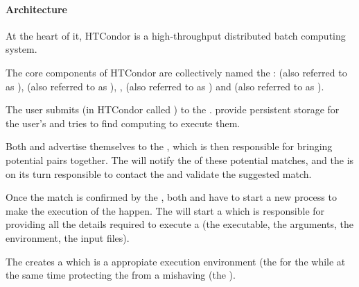 \documentclass{sig-alternate}
\begin{document}



\paragraph{Architecture}

At the heart of it, HTCondor is a high-throughput distributed batch computing
system.

%
%
The core components of HTCondor are collectively named the :  (also referred to as ),
 (also referred to as ), ,
 (also referred to as ) and
 (also referred to as ).

The user submits  (in HTCondor called ) to the
.
 provide persistent storage for the user's  and
tries to find computing   to execute them.

Both  and  advertise themselves to the
, which is then responsible for bringing potential pairs
together. The  will notify the  of these
potential matches, and the  is on its turn responsible to
contact the  and validate the suggested match.

Once the match is confirmed by the , both 
and  have to start a new process to make the execution of the
 happen.
The  will start a  which is responsible for
providing all the details required to execute a  (the
executable, the arguments, the environment, the input files).

The  creates a  which is a appropiate
execution environment (the  for the  while at the
same time protecting the  from a mishaving  (the
).
\end{document}
